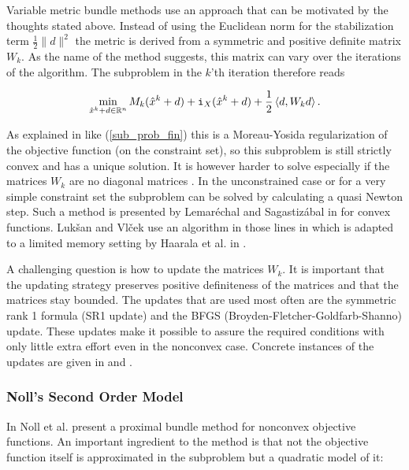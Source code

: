 Variable metric bundle methods use an approach that can be motivated by the thoughts stated above.
Instead of using the Euclidean norm for the stabilization term \(\frac{1}{2}\|d\|^2 \) the metric is derived from a symmetric and positive definite matrix \(W_k\). As the name of the method suggests, this matrix can vary over the iterations of the algorithm. The subproblem in the \(k\)'th iteration therefore reads 

\begin{equation*}
	\min_{\hat{x}^k+d \in \mathbb{R}^n} M_k(\hat{x}^k+d)+\mathtt{i}_{X}(\hat{x}^k+d)+\frac{1}{2}\left\langle d,W_kd \right\rangle.
\end{equation*}

As explained in \cite{Lemarechal1994} like (\ref{sub_prob_fin}) this is a Moreau-Yosida regularization of the objective function (on the constraint set), so this subproblem is still strictly convex and has a unique solution. It is however harder to solve especially if the matrices \(W_k\) are no diagonal matrices \cite{Luksan1999}.
In the unconstrained case or for a very simple constraint set the subproblem can be solved by calculating a quasi Newton step. Such a method is presented by Lemar\'{e}chal and Sagastiz\'{a}bal in \cite{Lemarechal1997} for convex functions. Luk\v{s}an and {Vl\v{c}ek} use an algorithm in those lines in \cite{Vlcek2001} which is adapted to a limited memory setting by Haarala et al. in \cite{Haarala2007}.

A challenging question is how to update the matrices \(W_k\). It is important that the updating strategy preserves positive definiteness of the matrices and that the matrices stay bounded. The updates that are used most often are the symmetric rank 1 formula (SR1 update) and the BFGS (Broyden-Fletcher-Goldfarb-Shanno) update. These updates make it possible to assure the required conditions with only little extra effort even in the nonconvex case. Concrete instances of the updates are given in \cite{Vlcek2001} and \cite{Lemarechal1994}.


\subsubsection{Noll's Second Order Model}

In \cite{Noll2012} Noll et al. present a proximal bundle method for nonconvex objective functions. An important ingredient to the method is that not the objective function itself is approximated in the subproblem but a quadratic model of it:

